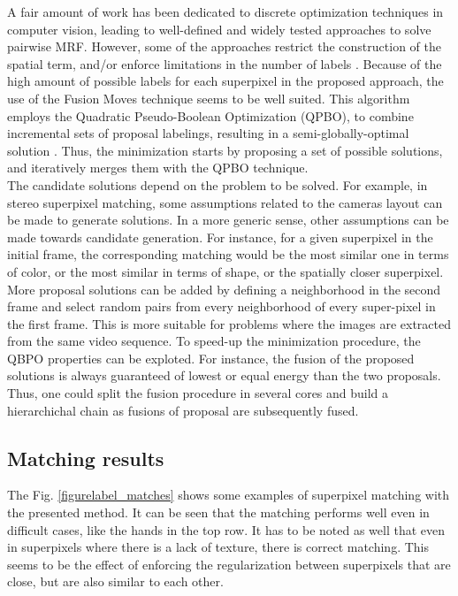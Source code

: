 A fair amount of work has been dedicated to discrete optimization techniques in computer vision,
leading to well-defined and widely tested approaches to solve pairwise MRF\cite{c3}\cite{c4}.
However, some of the approaches restrict the construction of the spatial term, and/or enforce
limitations in the number of labels \cite{c3}.
Because of the high amount of possible labels for  each superpixel in the proposed approach, the use of the
Fusion Moves \cite{c7} technique seems to be well suited.
This algorithm employs the Quadratic Pseudo-Boolean Optimization (QPBO), to combine
incremental sets of proposal labelings, resulting in a semi-globally-optimal solution \cite{c4}.
Thus, the minimization starts by proposing a set of possible solutions, and iteratively merges them with
the QPBO technique. \\
The candidate solutions depend on the problem to be solved. 
For example, in stereo superpixel matching, some assumptions related to the cameras 
layout can be made to generate solutions.
In a more generic sense, other assumptions can be made towards candidate generation. 
For instance, for a given superpixel in the initial frame, the corresponding 
matching would be the most similar one in terms of color, or the most similar in
terms of shape, or the spatially closer superpixel. More proposal solutions can be added by defining a
neighborhood in the second frame and select random pairs from every neighborhood of every super-pixel
in the first frame. This is more suitable for problems where the images are extracted from the same video
sequence. 
To speed-up the minimization procedure, the QBPO properties can be exploted. For instance, the fusion of the
proposed solutions is always guaranteed of lowest or equal energy than the two proposals. Thus, one could
split the fusion procedure in several cores and build a hierarchichal chain as fusions of proposal are subsequently fused.

\subsection{Matching results}
The Fig. \ref{figurelabel_matches} shows some examples of superpixel matching with the presented method. 
It can be seen that the matching performs well even in difficult cases, like the hands in the top row. It has to be noted
as well that even in superpixels where there is a lack of texture, there is correct matching. This seems to be
the effect of enforcing the regularization between superpixels that are close, but are also similar to
each other.

